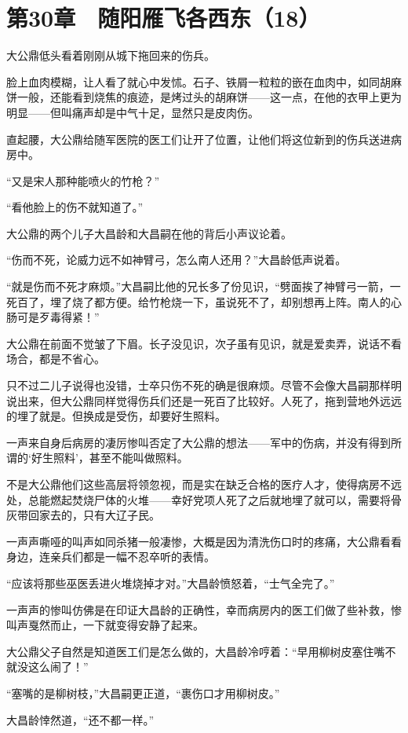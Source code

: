 \section{第30章　随阳雁飞各西东（18）}

大公鼎低头看着刚刚从城下拖回来的伤兵。

脸上血肉模糊，让人看了就心中发怵。石子、铁屑一粒粒的嵌在血肉中，如同胡麻饼一般，还能看到烧焦的痕迹，是烤过头的胡麻饼——这一点，在他的衣甲上更为明显——但叫痛声却是中气十足，显然只是皮肉伤。

直起腰，大公鼎给随军医院的医工们让开了位置，让他们将这位新到的伤兵送进病房中。

“又是宋人那种能喷火的竹枪？”

“看他脸上的伤不就知道了。”

大公鼎的两个儿子大昌龄和大昌嗣在他的背后小声议论着。

“伤而不死，论威力远不如神臂弓，怎么南人还用？”大昌龄低声说着。

“就是伤而不死才麻烦。”大昌嗣比他的兄长多了份见识，“劈面挨了神臂弓一箭，一死百了，埋了烧了都方便。给竹枪烧一下，虽说死不了，却别想再上阵。南人的心肠可是歹毒得紧！”

大公鼎在前面不觉皱了下眉。长子没见识，次子虽有见识，就是爱卖弄，说话不看场合，都是不省心。

只不过二儿子说得也没错，士卒只伤不死的确是很麻烦。尽管不会像大昌嗣那样明说出来，但大公鼎同样觉得伤兵们还是一死百了比较好。人死了，拖到营地外远远的埋了就是。但换成是受伤，却要好生照料。

一声来自身后病房的凄厉惨叫否定了大公鼎的想法——军中的伤病，并没有得到所谓的‘好生照料’，甚至不能叫做照料。

不是大公鼎他们这些高层将领忽视，而是实在缺乏合格的医疗人才，使得病房不远处，总能燃起焚烧尸体的火堆——幸好党项人死了之后就地埋了就可以，需要将骨灰带回家去的，只有大辽子民。

一声声嘶哑的叫声如同杀猪一般凄惨，大概是因为清洗伤口时的疼痛，大公鼎看看身边，连亲兵们都是一幅不忍卒听的表情。

“应该将那些巫医丢进火堆烧掉才对。”大昌龄愤怒着，“士气全完了。”

一声声的惨叫仿佛是在印证大昌龄的正确性，幸而病房内的医工们做了些补救，惨叫声戛然而止，一下就变得安静了起来。

大公鼎父子自然是知道医工们是怎么做的，大昌龄冷哼着：“早用柳树皮塞住嘴不就没这么闹了！”

“塞嘴的是柳树枝，”大昌嗣更正道，“裹伤口才用柳树皮。”

大昌龄悻然道，“还不都一样。”

